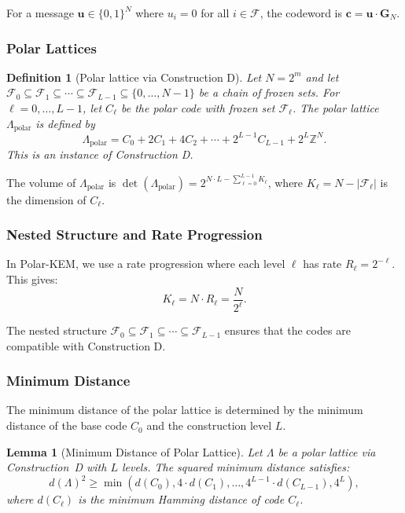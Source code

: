 \documentclass[11pt,a4paper]{article}
\newtheorem{lemma}[theorem]{Lemma}
\newtheorem{definition}[theorem]{Definition}
\newcommand{\polarKem}{\textsf{Polar-KEM}\xspace}
\newcommand{\bit}{\{0,1\}}
\newcommand{\Z}{\mathbb{Z}}
\begin{document}
For a message $\mathbf{u} \in \bit^N$ where $u_i = 0$ for all $i \in \mathcal{F}$, the codeword is $\mathbf{c} = \mathbf{u} \cdot \mathbf{G}_N$.

\subsubsection{Polar Lattices}

\begin{definition}[Polar lattice via Construction D]\label{def:polar-lattice}
Let $N = 2^m$ and let $\mathcal{F}_0 \subseteq \mathcal{F}_1 \subseteq \cdots \subseteq \mathcal{F}_{L-1} \subseteq \{0, \ldots, N-1\}$ be a chain of frozen sets. For $\ell = 0, \ldots, L-1$, let $C_\ell$ be the polar code with frozen set $\mathcal{F}_\ell$. The \emph{polar lattice} $\Lambda_{\text{polar}}$ is defined by
\[
\Lambda_{\text{polar}} = C_0 + 2C_1 + 4C_2 + \cdots + 2^{L-1}C_{L-1} + 2^L \Z^N.
\]
This is an instance of \emph{Construction D}.
\end{definition}

The volume of $\Lambda_{\text{polar}}$ is $\det(\Lambda_{\text{polar}}) = 2^{N \cdot L - \sum_{\ell=0}^{L-1} K_\ell}$, where $K_\ell = N - |\mathcal{F}_\ell|$ is the dimension of $C_\ell$.

\subsubsection{Nested Structure and Rate Progression}

In \polarKem, we use a rate progression where each level $\ell$ has rate $R_\ell = 2^{-\ell}$. This gives:
\[
K_\ell = N \cdot R_\ell = \frac{N}{2^\ell}.
\]

The nested structure $\mathcal{F}_0 \subseteq \mathcal{F}_1 \subseteq \cdots \subseteq \mathcal{F}_{L-1}$ ensures that the codes are compatible with Construction D.

\subsubsection{Minimum Distance}

The minimum distance of the polar lattice is determined by the minimum distance of the base code $C_0$ and the construction level $L$.

\begin{lemma}[Minimum Distance of Polar Lattice]\label{lem:min-dist}
Let $\Lambda$ be a polar lattice via Construction~D with $L$ levels. The squared minimum distance satisfies:
\[
d(\Lambda)^2 \geq \min\left(d(C_0), 4 \cdot d(C_1), \ldots, 4^{L-1} \cdot d(C_{L-1}), 4^L\right),
\]
where $d(C_\ell)$ is the minimum Hamming distance of code $C_\ell$.
\end{lemma}
\end{document}
